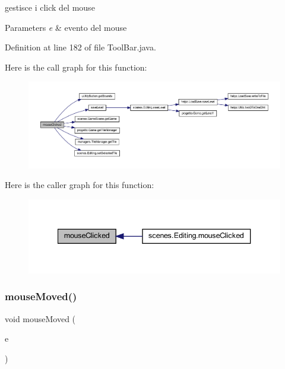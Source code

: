 gestisce i click del mouse 


\begin{DoxyParams}{Parameters}
{\em e} & evento del mouse \\
\hline
\end{DoxyParams}


Definition at line 182 of file Tool\+Bar.\+java.

Here is the call graph for this function\+:
\nopagebreak
\begin{figure}[H]
\begin{center}
\leavevmode
\includegraphics[width=350pt]{classui_1_1_tool_bar_a45d56bd84238e8b56589dfc732e2b2cf_cgraph}
\end{center}
\end{figure}
Here is the caller graph for this function\+:\nopagebreak
\begin{figure}[H]
\begin{center}
\leavevmode
\includegraphics[width=340pt]{classui_1_1_tool_bar_a45d56bd84238e8b56589dfc732e2b2cf_icgraph}
\end{center}
\end{figure}
\mbox{\label{classui_1_1_tool_bar_a2ca251710b65639ec80bc141edde60aa}} 
\subsubsection{\texorpdfstring{mouse\+Moved()}{mouseMoved()}}
{\footnotesize\ttfamily void mouse\+Moved (\begin{DoxyParamCaption}\item[{Mouse\+Event}]{e }\end{DoxyParamCaption})}



